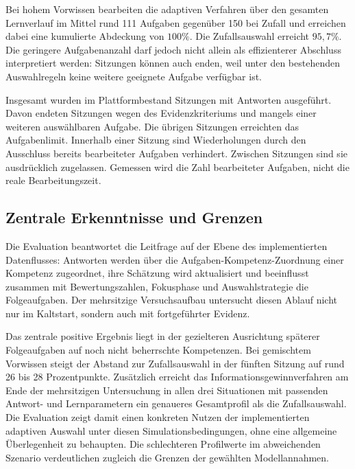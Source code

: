 Bei hohem Vorwissen bearbeiten die adaptiven Verfahren über den
gesamten Lernverlauf im Mittel rund 111 Aufgaben gegenüber 150 bei
Zufall und erreichen dabei eine kumulierte Abdeckung von $100\%$.
Die Zufallsauswahl erreicht $95{,}7\%$. Die geringere Aufgabenanzahl
darf jedoch nicht allein als effizienterer Abschluss interpretiert
werden: Sitzungen können auch enden, weil unter den bestehenden
Auswahlregeln keine weitere geeignete Aufgabe verfügbar ist.

Insgesamt wurden im Plattformbestand \EvaluationSessions{} Sitzungen mit
\EvaluationAnswers{} Antworten ausgeführt. Davon endeten
\EvaluationEvidenceEnds{} Sitzungen wegen des Evidenzkriteriums und
\EvaluationNoQuestionEnds{} mangels einer weiteren auswählbaren Aufgabe.
Die übrigen Sitzungen erreichten das Aufgabenlimit. Innerhalb einer
Sitzung sind Wiederholungen durch den Ausschluss bereits bearbeiteter
Aufgaben verhindert. Zwischen Sitzungen sind sie ausdrücklich zugelassen.
Gemessen wird die Zahl bearbeiteter Aufgaben, nicht die reale
Bearbeitungszeit.

\subsection{Zentrale Erkenntnisse und Grenzen}
\label{subsec:zentrale-erkenntnisse}

Die Evaluation beantwortet die Leitfrage auf der Ebene des implementierten
Datenflusses: Antworten werden über die Aufgaben-Kompetenz-Zuordnung einer
Kompetenz zugeordnet, ihre Schätzung wird aktualisiert und beeinflusst
zusammen mit Bewertungszahlen, Fokusphase und Auswahlstrategie die
Folgeaufgaben. Der mehrsitzige Versuchsaufbau untersucht diesen Ablauf
nicht nur im Kaltstart, sondern auch mit fortgeführter Evidenz.

Das zentrale positive Ergebnis liegt in der gezielteren Ausrichtung
späterer Folgeaufgaben auf noch nicht beherrschte Kompetenzen. Bei
gemischtem Vorwissen steigt der Abstand zur Zufallsauswahl in der
fünften Sitzung auf rund 26 bis 28 Prozentpunkte. Zusätzlich erreicht
das Informationsgewinnverfahren am Ende der mehrsitzigen Untersuchung
in allen drei Situationen mit passenden Antwort- und Lernparametern
ein genaueres Gesamtprofil als die Zufallsauswahl. Die Evaluation
zeigt damit einen konkreten Nutzen der implementierten adaptiven
Auswahl unter diesen Simulationsbedingungen, ohne eine allgemeine
Überlegenheit zu behaupten. Die schlechteren Profilwerte im
abweichenden Szenario verdeutlichen zugleich die Grenzen der
gewählten Modellannahmen.

